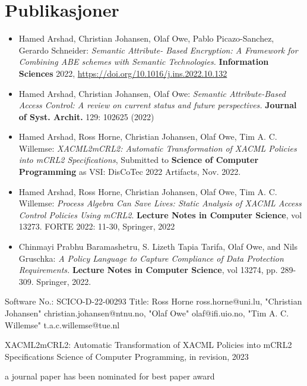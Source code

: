 \documentclass[11pt]{article}
\begin{document}
\section{Publikasjoner}
\label{sec-4}
\begin{itemize}
\item Hamed Arshad, Christian Johansen, Olaf Owe, Pablo Picazo-Sanchez,
 Gerardo Schneider: 
\emph{Semantic Attribute- Based Encryption: A Framework for Combining ABE
 schemes with Semantic Technologies.}
\textbf{Information Sciences} 2022,
 \url{https://doi.org/10.1016/j.ins.2022.10.132}
\item Hamed Arshad, Christian Johansen, Olaf Owe: 
\emph{Semantic Attribute-Based   Access Control: A review on current
 status and future perspectives.} 
\textbf{Journal of Syst. Archit.} 129: 102625 (2022)
\item Hamed Arshad, Ross Horne, Christian Johansen, Olaf Owe, Tim
 A. C. Willemse: 
\emph{XACML2mCRL2: Automatic Transformation of XACML Policies into mCRL2 Specifications},
 Submitted to \textbf{Science of Computer  Programming} as VSI: DisCoTec 2022 Artifacts, Nov. 2022.

\item Hamed Arshad, Ross Horne, Christian Johansen, Olaf Owe, Tim
A. C. Willemse: 
\emph{Process Algebra Can Save Lives: Static Analysis of  XACML Access Control Policies Using mCRL2}. 
\textbf{Lecture Notes in  Computer Science}, vol 13273. FORTE 2022: 11-30, Springer, 2022
\item Chinmayi Prabhu Baramashetru, S. Lizeth Tapia Tarifa, Olaf Owe, and
  Nils Gruschka: 
\emph{A Policy Language to Capture  Compliance of Data Protection Requirements.}
  \textbf{Lecture Notes in Computer Science}, vol 13274,
  pp. 289-309. Springer, 2022.
\end{itemize}


Software No.: SCICO-D-22-00293 
Title:  
Ross Horne ross.horne@uni.lu, "Christian Johansen" christian.johansen@ntnu.no, "Olaf Owe" olaf@ifi.uio.no, "Tim A. C. Willemse" t.a.c.willemse@tue.nl

XACML2mCRL2: Automatic Transformation of XACML Policies into mCRL2 Specifications  
Science of Computer Programming, in revision, 2023

a journal paper has been nominated for best paper award
\end{document}
